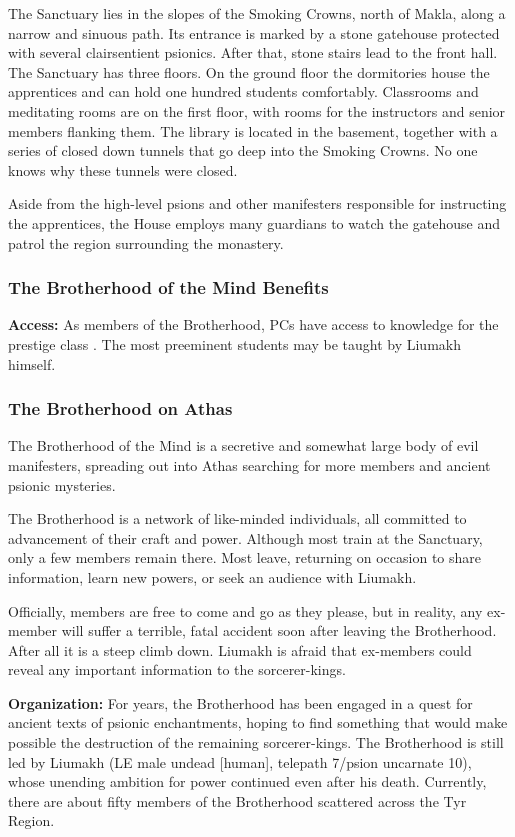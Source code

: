 The Sanctuary lies in the slopes of the Smoking Crowns, north of Makla, along a narrow and sinuous path. Its entrance is marked by a stone gatehouse protected with several clairsentient psionics. After that, stone stairs lead to the front hall. The Sanctuary has three floors. On the ground floor the dormitories house the apprentices and can hold one hundred students comfortably. Classrooms and meditating rooms are on the first floor, with rooms for the instructors and senior members flanking them. The library is located in the basement, together with a series of closed down tunnels that go deep into the Smoking Crowns. No one knows why these tunnels were closed.

Aside from the high-level psions and other manifesters responsible for instructing the apprentices, the House employs many guardians to watch the gatehouse and patrol the region surrounding the monastery.

\subsubsection{The Brotherhood of the Mind Benefits}
\textbf{Access:} As members of the Brotherhood, PCs have access to knowledge for the prestige class . The most preeminent students may be taught by Liumakh himself.

\subsubsection{The Brotherhood on Athas}
The Brotherhood of the Mind is a secretive and somewhat large body of evil manifesters, spreading out into Athas searching for more members and ancient psionic mysteries.

The Brotherhood is a network of like-minded individuals, all committed to advancement of their craft and power. Although most train at the Sanctuary, only a few members remain there. Most leave, returning on occasion to share information, learn new powers, or seek an audience with Liumakh.

Officially, members are free to come and go as they please, but in reality, any ex-member will suffer a terrible, fatal accident soon after leaving the Brotherhood. After all it is a steep climb down. Liumakh is afraid that ex-members could reveal any important information to the sorcerer-kings.

\textbf{Organization:} For years, the Brotherhood has been engaged in a quest for ancient texts of psionic enchantments, hoping to find something that would make possible the destruction of the remaining sorcerer-kings. The Brotherhood is still led by Liumakh (LE male undead [human], telepath 7/psion uncarnate 10), whose unending ambition for power continued even after his death. Currently, there are about fifty members of the Brotherhood scattered across the Tyr Region.

